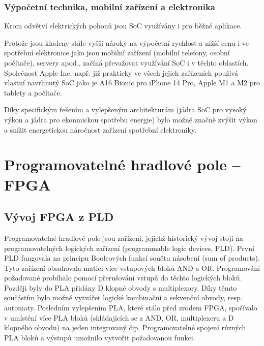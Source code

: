 \documentclass[a4paper, twoside, 11pt]{article}
\begin{document}
	\subsubsection{Výpočetní technika, mobilní zařízení a elektronika}
	Krom odvětví elektrických pohonů jsou SoC využívány i pro běžné aplikace.\par
	Protože jsou kladeny stále vyšší nároky na výpočetní rychlost a nižší cenu i ve spotřební elektronice jako jsou mobilní zařízení (mobilní telefony, osobní počítače), servery apod., začíná převažovat využívání SoC i v těchto oblastích.
	Společnost Apple Inc. např. již prakticky ve všech jejich zařízeních používá vlastní navrhnutý SoC jako je A16 Bionic pro iPhone 14 Pro, Apple M1 a M2 pro tablety a počítače.\par
	Díky specifickým řešením a vylepšeným architekturám (jádra SoC pro vysoký výkon a jádra pro ekonmickou spotřebu energie) bylo možné značně zvýšit výkon a snížit energetickou náročnost zařízení spotřební elektroniky.


	\section{Programovatelné hradlové pole – FPGA}
		\subsection{Vývoj FPGA z PLD}
		Programovatelné hradlové pole jsou zařízení, jejichž historický vývoj stojí na programovatelných logických zařízení (programmable logic devices, PLD). První PLD fungovala na principu Booleových funkcí součtu násobení (sum of products). Tyto zařízení obsahovala matici více vstupových bloků AND a OR. Programování požadované probíhalo pomocí přerušování vstupů do těchto logických bloků. Později byly do PLA přidány D klopné obvody s multiplexory. Díky těmto součástím bylo možné vytvářet logické kombinační a sekvenční obvody, resp. automaty. Posledním vylepšením PLA, které stálo před zrodem FPGA, spočívalo v umístění více PLA bloků (skládajících se z AND, OR, multiplexeru a D klopného obvodu) na jeden integrovaný čip. Programovatelné spojení různých PLA bloků a výstupů umožnilo vytvořit požadovanou funkci. \cite{Sass2010}\par
\end{document}
